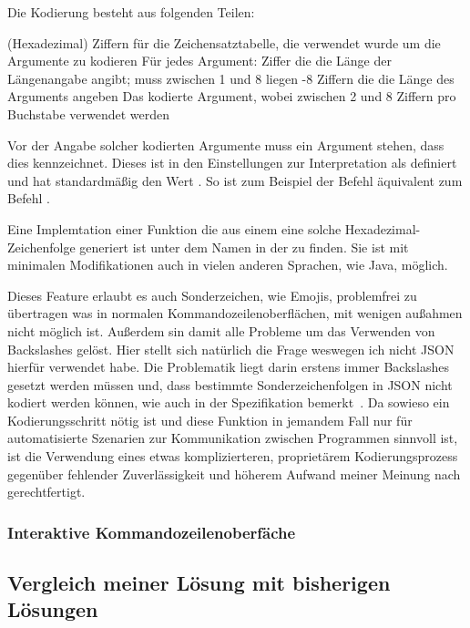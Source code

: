 Die Kodierung besteht aus folgenden Teilen:
\begin{outline}
  (Hexadezimal) Ziffern für die Zeichensatztabelle, die verwendet wurde um die Argumente zu kodieren
 \1 Für jedes Argument:
   Ziffer die die Länge der Längenangabe angibt;
  muss zwischen 1 und 8 liegen 
  -8 Ziffern die die Länge des Arguments angeben
  \2 Das kodierte Argument, wobei zwischen 2 und 8 Ziffern pro Buchstabe verwendet werden
\end{outline}

Vor der Angabe solcher kodierten Argumente muss ein Argument stehen, dass dies kennzeichnet.
Dieses ist in den Einstellungen zur Interpretation als  definiert und hat standardmä\ss ig den Wert .
So ist zum Beispiel der Befehl  äquivalent zum Befehl .

Eine Implemtation einer Funktion die aus einem  eine solche Hexadezimal-Zeichenfolge generiert ist unter dem Namen  in der  zu finden.
Sie ist mit minimalen Modifikationen auch in vielen anderen Sprachen, wie Java, möglich.

Dieses Feature erlaubt es auch Sonderzeichen, wie Emojis, problemfrei zu übertragen was in normalen Kommandozeilenoberflächen, mit wenigen au\ss ahmen nicht möglich ist.
Au\ss erdem sin damit alle Probleme um das Verwenden von Backslashes gelöst.
Hier stellt sich natürlich die Frage weswegen ich nicht JSON hierfür verwendet habe.
Die Problematik liegt darin erstens immer Backslashes gesetzt werden müssen und, dass bestimmte Sonderzeichenfolgen in JSON nicht kodiert werden können, wie auch in der Spezifikation bemerkt~\cite{JSONSpec}.
Da sowieso ein Kodierungsschritt nötig ist und diese Funktion in jemandem Fall nur für automatisierte Szenarien zur Kommunikation zwischen Programmen sinnvoll ist,
ist die Verwendung eines etwas komplizierteren, proprietärem  Kodierungsprozess gegenüber fehlender Zuverlässigkeit und höherem Aufwand meiner Meinung nach gerechtfertigt.
\subsubsection{Interaktive Kommandozeilenoberfäche}

\subsection{Vergleich meiner Lösung mit bisherigen Lösungen}\label{subsec:Comparison}